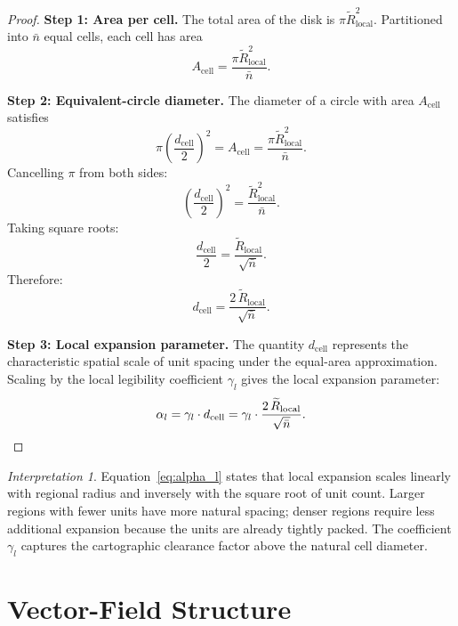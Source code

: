 \documentclass[12pt, a4paper]{article}
\numberwithin{equation}{section}
\theoremstyle{definition}
\theoremstyle{plain}
\theoremstyle{remark}
\newtheorem*{interpretation}{Interpretation}
\begin{document}
\begin{proof}

\medskip\noindent\textbf{Step 1: Area per cell.}
The total area of the disk is $\pi\widetilde{R}_{\text{local}}^2$. Partitioned into $\bar{n}$ equal cells, each cell has area
\begin{equation}
  A_{\text{cell}} = \frac{\pi\widetilde{R}_{\text{local}}^2}{\bar{n}}.
  \label{eq:acell}
\end{equation}

\medskip\noindent\textbf{Step 2: Equivalent-circle diameter.}
The diameter of a circle with area $A_{\text{cell}}$ satisfies
\[
  \pi\left(\frac{d_{\text{cell}}}{2}\right)^{\!2} = A_{\text{cell}} = \frac{\pi\widetilde{R}_{\text{local}}^2}{\bar{n}}.
\]
Cancelling $\pi$ from both sides:
\[
  \left(\frac{d_{\text{cell}}}{2}\right)^{\!2} = \frac{\widetilde{R}_{\text{local}}^2}{\bar{n}}.
\]
Taking square roots:
\[
  \frac{d_{\text{cell}}}{2} = \frac{\widetilde{R}_{\text{local}}}{\sqrt{\bar{n}}}.
\]
Therefore:
\begin{equation}
  d_{\text{cell}} = \frac{2\,\widetilde{R}_{\text{local}}}{\sqrt{\bar{n}}}. \label{eq:dcell_proof}
\end{equation}

\medskip\noindent\textbf{Step 3: Local expansion parameter.}
The quantity $d_{\text{cell}}$ represents the characteristic spatial scale of unit spacing under the equal-area approximation. Scaling by the local legibility coefficient $\gamma_l$ gives the local expansion parameter:
\[
  \alpha_l = \gamma_l \cdot d_{\text{cell}} = \gamma_l \cdot \frac{2\,\widetilde{R}_{\text{local}}}{\sqrt{\bar{n}}}. \qedhere
\]
\end{proof}

\begin{interpretation}
Equation~\eqref{eq:alpha_l} states that local expansion scales linearly with regional radius and inversely with the square root of unit count. Larger regions with fewer units have more natural spacing; denser regions require less additional expansion because the units are already tightly packed. The coefficient $\gamma_l$ captures the cartographic clearance factor above the natural cell diameter.
\end{interpretation}


\section{Vector-Field Structure}
\label{sec:field}
\end{document}
